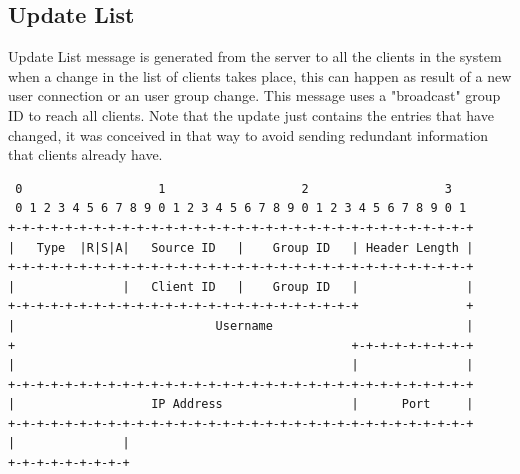 \documentclass{article}
\begin{document}
\subsection{Update List}
Update List message is generated from the server to all the clients in the system when a change in the list of clients takes place, this can happen as result of a new user connection or an user group change. This message uses a "broadcast" group ID to reach all clients. Note that the update just contains the entries that have changed, it was conceived in that way to avoid sending redundant information that clients already have.
\begin{verbatim}  
 0                   1                   2                   3  
 0 1 2 3 4 5 6 7 8 9 0 1 2 3 4 5 6 7 8 9 0 1 2 3 4 5 6 7 8 9 0 1
+-+-+-+-+-+-+-+-+-+-+-+-+-+-+-+-+-+-+-+-+-+-+-+-+-+-+-+-+-+-+-+-+
|   Type  |R|S|A|   Source ID   |    Group ID   | Header Length |
+-+-+-+-+-+-+-+-+-+-+-+-+-+-+-+-+-+-+-+-+-+-+-+-+-+-+-+-+-+-+-+-+
|               |   Client ID   |    Group ID   |               |
+-+-+-+-+-+-+-+-+-+-+-+-+-+-+-+-+-+-+-+-+-+-+-+-+               +
|                            Username                           |
+                                               +-+-+-+-+-+-+-+-+
|                                               |               |
+-+-+-+-+-+-+-+-+-+-+-+-+-+-+-+-+-+-+-+-+-+-+-+-+-+-+-+-+-+-+-+-+
|                   IP Address                  |      Port     |
+-+-+-+-+-+-+-+-+-+-+-+-+-+-+-+-+-+-+-+-+-+-+-+-+-+-+-+-+-+-+-+-+
|               |
+-+-+-+-+-+-+-+-+
\end{verbatim}
\end{document}
